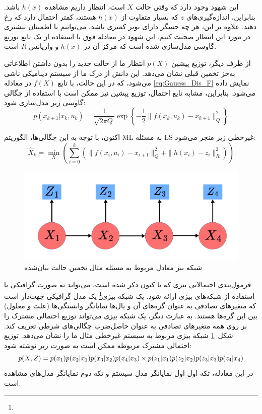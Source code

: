 این شهود وجود دارد که وقتی حالت \(X\) است، انتظار داریم مشاهده \(h(x)\) باشد. بنابراین،
اندازه‌گیری‌های \(z\) که بسیار متفاوت از \(h(x)\) هستند، کمتر احتمال دارد که رخ دهند. علاوه بر این،
هر چه حسگر دارای نویز کمتری باشد، می‌توانیم با اطمینان بیشتری در مورد این انتظار صحبت کنیم. این
شهود در معادله فوق با استفاده از یک تابع توزیع گاوسی مدل‌سازی شده است که
مرکز آن در \(h(x)\) و واریانس \(R\) است.

از طرف دیگر، توزیع پیشین \(p(X)\) انتظار ما از حالت جدید را بدون داشتن اطلاعاتی به‌جز تخمین قبلی نشان می‌دهد. این دانش از
درک ما از سیستم دینامیکی ناشی می‌شود، که در این حالت، با تابع \(f(X)\)
در معادله
\ref{eq:Gauess_Dis_F}
 نمایش داده می‌شود. بنابراین، مشابه تابع احتمال، توزیع پیشین نیز ممکن است
با استفاده از چگالی گاوسی زیر مدل‌سازی شود:
\begin{equation} \label{eq:Gauess_Dis_F}
	p(x_{k+1}|x_k, u_k) = \frac{1}{\sqrt{2\pi Q}} \exp \left\{ -\frac{1}{2} \| f(x_k, u_k) - x_{k+1} \|_Q^2 \right\}
\end{equation}

اکنون، با توجه به این چگالی‌ها، الگوریتم ML به مسئله LS غیرخطی زیر
منجر می‌شود:
\begin{equation}
	\hat{X}_k = \min_X \left( \sum_{i=0}^k \left(\| f(x_i, u_i) - x_{i+1} \|_Q^2 + \| h(x_i) - z_i \|_R^2 \right) \right)
\end{equation}

\begin{figure} [!t]
	\centering
	\includegraphics[width=0.5\linewidth]{img/BeyseNetAppendix}
	\caption{شبکه بیز معادل مربوط به مسئله مثال  تخمین حالت بیان‌شده}
	\label{fig:beysenetappendix}
\end{figure}

فرمول‌بندی احتمالاتی بیزی که تا کنون ذکر شده است، می‌تواند به صورت گرافیکی
با استفاده از شبکه‌های بیزی ارائه شود. یک شبکه بیزی\footnote{}
یک مدل گرافیکی جهت‌دار است
که متغیرهای تصادفی به عنوان گره‌های آن و یال‌ها نمایانگر وابستگی‌ها (علت و معلول)
بین این گره‌ها هستند. به عبارت دیگر، یک شبکه بیزی می‌تواند توزیع احتمالی مشترک
را بر روی همه متغیرهای تصادفی به عنوان حاصل‌ضرب چگالی‌های شرطی تعریف کند. شکل~\ref{fig:beysenetappendix}
شبکه بیزی مربوط به سیستم غیرخطی مثال ما را نشان می‌دهد. توزیع احتمالی مشترک
مربوطه ممکن است به صورت زیر نوشته شود:
\begin{equation} \label{eq:JointProbability_Distribution}
	p(X, Z) = p(x_1) p(x_2|x_1) p(x_3|x_2) p(x_4|x_3) \newline
	\times p(z_1|x_1) p(z_2|x_2) p(z_3|x_3) p(z_4|x_4)
\end{equation}
در این معادله، تکه اول اول نمایانگر مدل سیستم و تکه دوم
نمایانگر مدل‌های مشاهده است.

